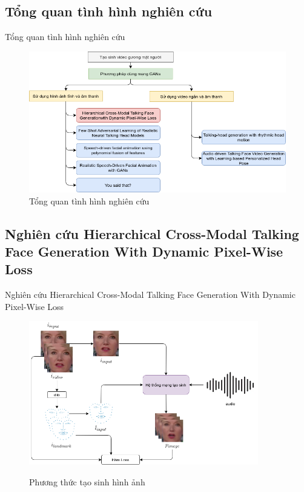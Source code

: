 \subsection{Tổng quan tình hình nghiên cứu}
\begin{frame}{Tổng quan tình hình nghiên cứu}
\begin{figure}[H]
    \centering
    \includegraphics[width=12.5cm]{images/related_work_tree.png}
    \caption{Tổng quan tình hình nghiên cứu}
    \label{fig:related_work_tree}
\end{figure}
\end{frame}

\subsection{Nghiên cứu Hierarchical Cross-Modal Talking Face Generation With Dynamic Pixel-Wise Loss \cite{chen2019}}

\begin{frame}{Nghiên cứu Hierarchical Cross-Modal Talking Face Generation With Dynamic Pixel-Wise Loss \cite{chen2019}}
    \begin{figure}[H]
    \centering
    \includegraphics[width=10cm]{images/processing-training.png}
    \label{fig:processing-training}
    \caption{Phương thức tạo sinh hình ảnh}
    \end{figure}
\end{frame}

